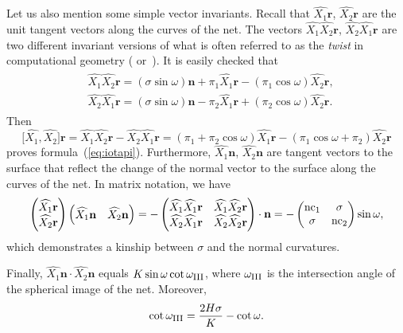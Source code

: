\documentclass[pdftex]{sigma}
\let\ve\mathbf
\def\nc#1{{\mathop{\rm nc}}_{#1}}
\def\omegaIII{\omega_{\hbox{\sc iii}}}
\def\eqref#1{{\rm(\ref{#1})}}
\numberwithin{equation}{section}
\begin{document}
Let us also mention some simple vector invariants.
Recall that $\widehat{X_1} \ve r$, $\widehat{X_2} \ve r$ are the unit tangent vectors along
the curves of the net.
The vectors $\widehat{X_1} \widehat{X_2} \ve r$, $\widehat{X_2} \widehat{X_1} \ve r$ are
two different invariant versions of what is often referred to as the {\it twist} in
computational geometry
(\cite[end of Section~7.1]{F-P-1979} or~\cite{B-F-F-H}).
It is easily checked that
\begin{gather}\label{eq:XYvect}
\begin{split}
&\widehat{X_1} \widehat{X_2} \ve r = (\sigma \sin\omega) \ve n
 + \pi_1 \widehat{X_1} \ve r - (\pi_1 \cos\omega) \widehat{X_2} \ve r,
\\
& \widehat{X_2} \widehat{X_1} \ve r = (\sigma \sin\omega) \ve n
 - \pi_2 \widehat{X_1} \ve r + (\pi_2 \cos\omega) \widehat{X_2} \ve r.
 \end{split}
\end{gather}
Then
\[
\bigl[\widehat{X_1}, \widehat{X_2}\bigr] \ve r = \widehat{X_1} \widehat{X_2} \ve r - \widehat{X_2} \widehat{X_1} \ve r
 = (\pi_1 + \pi_2 \cos\omega) \widehat{X_1} \ve r
 - (\pi_1 \cos\omega + \pi_2) \widehat{X_2} \ve r
\]
proves formula~\eqref{eq:iotapi}.
Furthermore, $\widehat{X_1} \ve n$, $\widehat{X_2} \ve n$ are tangent vectors to the surface that
reflect the change of the normal vector to the surface along the curves of the net.
In matrix notation, we have
\begin{gather*}
\begin{pmatrix} \widehat{X_1} \ve r \\ \widehat{X_2} \ve r \end{pmatrix}
\begin{pmatrix} \widehat{X_1} \ve n & \widehat{X_2} \ve n \end{pmatrix}
 = -\begin{pmatrix} \widehat{X_1} \widehat{X_1} \ve r & \widehat{X_1} \widehat{X_2} \ve r \\
    \widehat{X_2} \widehat{X_1} \ve r & \widehat{X_2} \widehat{X_2} \ve r
    \end{pmatrix} \cdot \ve n
 = -\begin{pmatrix} \nc1 & \sigma \\ \sigma & \nc2\end{pmatrix} \sin\omega,
\end{gather*}
which demonstrates a kinship between $\sigma$ and the normal curvatures.

Finally, $\widehat{X_1} \ve n \cdot \widehat{X_2} \ve n$
equals $K \sin \omega \cot \omegaIII$, where $\omegaIII$
is the intersection angle of the spherical image of the net.
Moreover,
\begin{gather}\label{eq:cotphiIII}
\cot\omegaIII
 = \frac{2 H \sigma}{K} - \cot\omega.
\end{gather}
\end{document}
